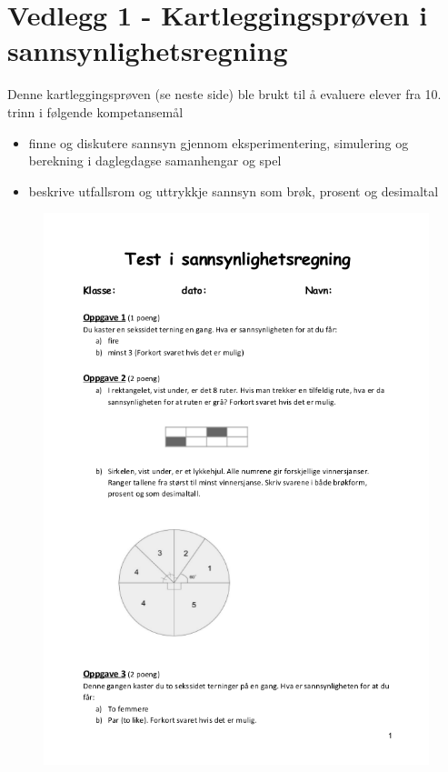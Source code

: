 \documentclass[main.tex]{subfiles}
\begin{document}
\appendix
\section*{Vedlegg 1 - Kartleggingsprøven i sannsynlighetsregning}
\label{prove}
Denne kartleggingsprøven (se neste side) ble brukt til å evaluere elever fra 10. trinn
i følgende kompetansemål 
\begin{itemize}
\item finne og diskutere sannsyn gjennom eksperimentering, simulering og berekning i daglegdagse samanhengar og spel
\item beskrive utfallsrom og uttrykkje sannsyn som brøk, prosent og desimaltal
\end{itemize}
\begin{figure}[h!]
  \centering
  \includegraphics[width=.9\linewidth]{../figures/test1.png}
\end{figure}
\end{document}
